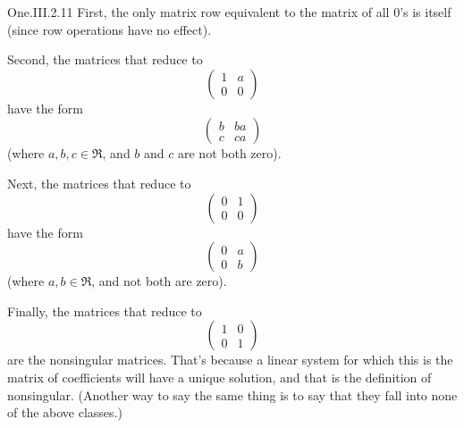 \begin{ans}{One.III.2.11}
       First, the only matrix row equivalent to the matrix of all
       \( 0 \)'s is itself (since row operations have no effect).

       Second, the matrices that reduce to
       \begin{equation*}
         \begin{pmatrix}
           1  &a  \\
           0  &0
         \end{pmatrix}
       \end{equation*}
       have the form
       \begin{equation*}
         \begin{pmatrix}
           b  &ba \\
           c  &ca
         \end{pmatrix}
       \end{equation*}
       (where \( a,b,c\in\Re \), and \(b\) and \(c\) are not both zero).

       Next, the matrices that reduce to
       \begin{equation*}
         \begin{pmatrix}
           0  &1  \\
           0  &0
         \end{pmatrix}
       \end{equation*}
       have the form
       \begin{equation*}
         \begin{pmatrix}
           0  &a \\
           0  &b
         \end{pmatrix}
       \end{equation*}
       (where \( a,b\in\Re \), and not both are zero).

       Finally, the matrices that reduce to
       \begin{equation*}
         \begin{pmatrix}
           1  &0  \\
           0  &1
         \end{pmatrix}
       \end{equation*}
       are the nonsingular matrices.
       That's because a linear system for which this is the matrix of
       coefficients will have a unique solution, and that is the definition
       of nonsingular.
       (Another way to say the same thing is to say that they fall into none
       of the above classes.)
     
\end{ans}
